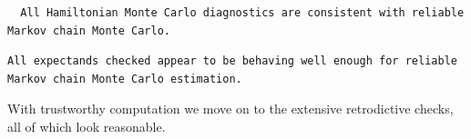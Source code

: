 \documentclass[
  letterpaper,
  DIV=11,
  numbers=noendperiod]{scrartcl}
\newenvironment{Shaded}{\begin{snugshade}}{\end{snugshade}}
\newcommand{\AttributeTok}[1]{\textcolor[rgb]{0.40,0.45,0.13}{#1}}
\newcommand{\ConstantTok}[1]{\textcolor[rgb]{0.56,0.35,0.01}{#1}}
\newcommand{\FunctionTok}[1]{\textcolor[rgb]{0.28,0.35,0.67}{#1}}
\newcommand{\NormalTok}[1]{\textcolor[rgb]{0.00,0.23,0.31}{#1}}
\newcommand{\OtherTok}[1]{\textcolor[rgb]{0.00,0.23,0.31}{#1}}
\newcommand{\SpecialCharTok}[1]{\textcolor[rgb]{0.37,0.37,0.37}{#1}}
\newcommand{\StringTok}[1]{\textcolor[rgb]{0.13,0.47,0.30}{#1}}
\begin{document}
\begin{verbatim}
  All Hamiltonian Monte Carlo diagnostics are consistent with reliable
Markov chain Monte Carlo.
\end{verbatim}

\begin{Shaded}
\end{Shaded}

\begin{verbatim}
All expectands checked appear to be behaving well enough for reliable
Markov chain Monte Carlo estimation.
\end{verbatim}

With trustworthy computation we move on to the extensive retrodictive
checks, all of which look reasonable.
\end{document}
